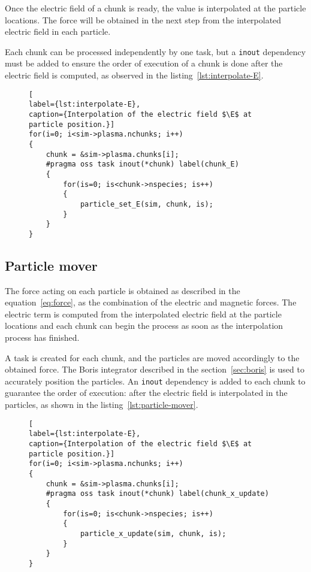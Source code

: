 %
Once the electric field of a chunk is ready, the value is interpolated at the 
particle locations. The force will be obtained in the next step from the 
interpolated electric field in each particle.

Each chunk can be processed independently by one task, but a \texttt{inout} 
dependency must be added to ensure the order of execution of a chunk is done 
after the electric field is computed, as observed in the 
listing~\ref{lst:interpolate-E}.
%
\begin{figure}[ht]%
\begin{lstlisting}[
label={lst:interpolate-E},
caption={Interpolation of the electric field $\E$ at particle position.}]
for(i=0; i<sim->plasma.nchunks; i++)
{
	chunk = &sim->plasma.chunks[i];
	#pragma oss task inout(*chunk) label(chunk_E)
	{
		for(is=0; is<chunk->nspecies; is++)
		{
			particle_set_E(sim, chunk, is);
		}
	}
}
\end{lstlisting}
\end{figure}%
%
\subsection{Particle mover}

The force acting on each particle is obtained as described in the 
equation~\ref{eq:force}, as the combination of the electric and magnetic forces.  
The electric term is computed from the interpolated electric field at the 
particle locations and each chunk can begin the process as soon as the 
interpolation process has finished.

A task is created for each chunk, and the particles are moved accordingly to the 
obtained force. The Boris integrator described in the section~\ref{sec:boris} is 
used to accurately position the particles. An \texttt{inout} dependency is added 
to each chunk to guarantee the order of execution: after the electric field is 
interpolated in the particles, as shown in the listing~\ref{lst:particle-mover}.
%
\begin{figure}[ht]%
\begin{lstlisting}[
label={lst:interpolate-E},
caption={Interpolation of the electric field $\E$ at particle position.}]
for(i=0; i<sim->plasma.nchunks; i++)
{
	chunk = &sim->plasma.chunks[i];
	#pragma oss task inout(*chunk) label(chunk_x_update)
	{
		for(is=0; is<chunk->nspecies; is++)
		{
			particle_x_update(sim, chunk, is);
		}
	}
}
\end{lstlisting}
\end{figure}%
